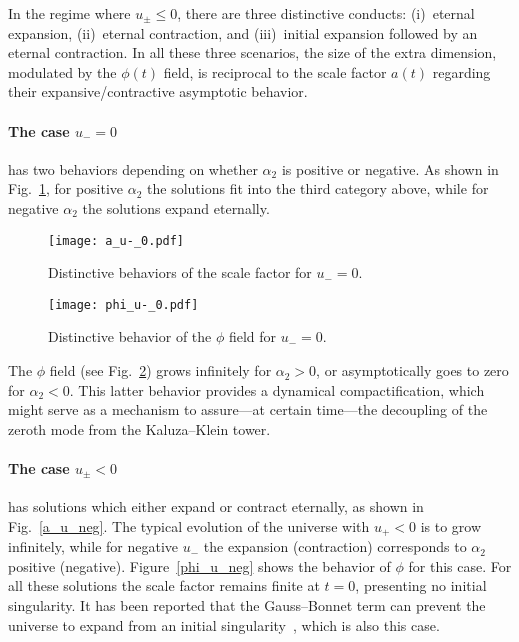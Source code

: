 \documentclass[aps,prd,12pt,superscriptaddress,showpacs,showkeys,longbibliography,reprint,nofootinbib]{revtex4-1}
\begin{document}
In the regime where $u_\pm \leq 0$, there are three distinctive conducts: (i)~eternal expansion, (ii)~eternal contraction, and (iii)~initial expansion followed by an eternal contraction. In all these three scenarios, the size of the extra dimension, modulated by the $\phi(t)$ field, is reciprocal to the scale factor $a(t)$ regarding their expansive/contractive asymptotic behavior.


\paragraph{The case $u_- = 0$} has two behaviors depending on whether $\alpha_2$ is positive or negative. As shown in Fig.~\ref{a_u_0}, for positive $\alpha_2$ the solutions fit into the third category above, while for negative $\alpha_2$ the solutions expand eternally. %
\begin{figure}[H]
  \texttt{[image: a\_u-\_0.pdf]} 
  \caption{Distinctive behaviors of the scale factor for $u_- = 0$.}
  \label{a_u_0}
\end{figure}
\begin{figure}[H]
  \texttt{[image: phi\_u-\_0.pdf]}
  \caption{Distinctive behavior of the $\phi$ field for $u_- = 0$.}
  \label{phi_u_0}
\end{figure}
The $\phi$ field (see Fig.~\ref{phi_u_0}) grows infinitely for $\alpha_2 > 0$, or asymptotically goes to zero for $\alpha_2 < 0$. This latter behavior provides a {dynamical} compactification, which might serve as a mechanism to assure---at certain time---the decoupling of the zeroth mode from the Kaluza--Klein tower.


\paragraph{The case $u_\pm < 0$} has solutions which either expand or contract eternally, as shown in Fig.~\ref{a_u_neg}. The typical evolution of the universe with $u_+ < 0$ is to grow infinitely, while for negative $u_-$ the expansion (contraction) corresponds to $\alpha_2$ positive (negative). Figure~\ref{phi_u_neg} shows the behavior of $\phi$ for this case. %
For all these solutions the scale factor remains finite at $t = 0$, presenting no initial singularity. It has been reported that the Gauss--Bonnet term can prevent the universe to expand from an initial singularity~\cite{Deruelle:1986iv,Henriques:1986jw,*Ishihara:1986if}, which is also this case.
\end{document}
